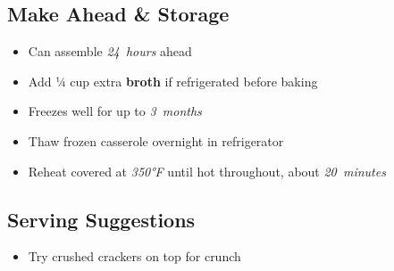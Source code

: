 \documentclass[11pt,letterpaper]{article}
\begin{document}
{\begin{multicols}{2}
\subsection*{Make Ahead \& Storage}
\begin{itemize}
    \item Can assemble \textit{24~hours} ahead
    \item Add ¼ cup extra \textbf{broth} if refrigerated before baking
    \item Freezes well for up to \textit{3~months}
    \item Thaw frozen casserole overnight in refrigerator
    \item Reheat covered at \textit{350°F} until hot throughout, about \textit{20~minutes}
\end{itemize}

\subsection*{Serving Suggestions}
\begin{itemize}
    \item Try crushed crackers on top for crunch
\end{itemize}

\end{multicols}
}
\end{document}
